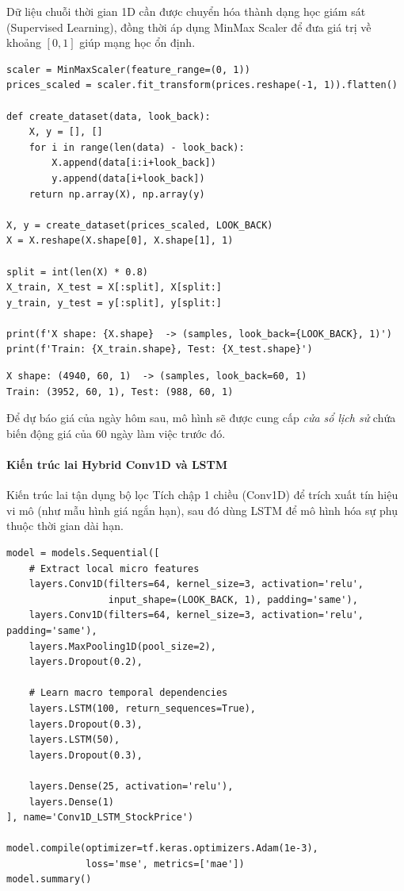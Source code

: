 Dữ liệu chuỗi thời gian 1D cần được chuyển hóa thành dạng học giám sát (Supervised Learning), đồng thời áp dụng MinMax Scaler để đưa giá trị về khoảng $[0, 1]$ giúp mạng học ổn định.

\begin{lstlisting}[style=pythoncode, caption={Trích xuất cửa sổ thời gian (Sliding Window)}]
scaler = MinMaxScaler(feature_range=(0, 1))
prices_scaled = scaler.fit_transform(prices.reshape(-1, 1)).flatten()

def create_dataset(data, look_back):
    X, y = [], []
    for i in range(len(data) - look_back):
        X.append(data[i:i+look_back])
        y.append(data[i+look_back])
    return np.array(X), np.array(y)

X, y = create_dataset(prices_scaled, LOOK_BACK)
X = X.reshape(X.shape[0], X.shape[1], 1)

split = int(len(X) * 0.8)
X_train, X_test = X[:split], X[split:]
y_train, y_test = y[:split], y[split:]

print(f'X shape: {X.shape}  -> (samples, look_back={LOOK_BACK}, 1)')
print(f'Train: {X_train.shape}, Test: {X_test.shape}')
\end{lstlisting}

\begin{lstlisting}[style=consoleoutput, caption={Output: Kích thước Tensor đầu vào}]
X shape: (4940, 60, 1)  -> (samples, look_back=60, 1)
Train: (3952, 60, 1), Test: (988, 60, 1)
\end{lstlisting}

Để dự báo giá của ngày hôm sau, mô hình sẽ được cung cấp \textit{cửa sổ lịch sử} chứa biến động giá của 60 ngày làm việc trước đó.

\paragraph{Kiến trúc lai Hybrid Conv1D và LSTM} \hfill\mbox{}

Kiến trúc lai tận dụng bộ lọc Tích chập 1 chiều (Conv1D) để trích xuất tín hiệu vi mô (như mẫu hình giá ngắn hạn), sau đó dùng LSTM để mô hình hóa sự phụ thuộc thời gian dài hạn.

\begin{lstlisting}[style=pythoncode, caption={Xây dựng mạng Conv1D kết hợp LSTM}]
model = models.Sequential([
    # Extract local micro features
    layers.Conv1D(filters=64, kernel_size=3, activation='relu',
                  input_shape=(LOOK_BACK, 1), padding='same'),
    layers.Conv1D(filters=64, kernel_size=3, activation='relu', padding='same'),
    layers.MaxPooling1D(pool_size=2),
    layers.Dropout(0.2),
    
    # Learn macro temporal dependencies
    layers.LSTM(100, return_sequences=True),
    layers.Dropout(0.3),
    layers.LSTM(50),
    layers.Dropout(0.3),
    
    layers.Dense(25, activation='relu'),
    layers.Dense(1)
], name='Conv1D_LSTM_StockPrice')

model.compile(optimizer=tf.keras.optimizers.Adam(1e-3),
              loss='mse', metrics=['mae'])
model.summary()
\end{lstlisting}

